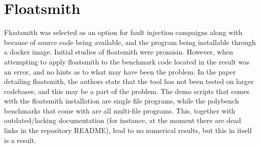 \section{Floatsmith}

Floatsmith was selected as an option for fault injection campaigns along with \taffo{} because of source code being available, and the program being installable through a docker image. Initial studies of floatsmith were promisin.
However, when attempting to apply floatsmith to the benchmark code located in \taffo{} the result was an error, and no hints as to what may have been the problem. In the paper detailing floatsmith, the authors state that the tool has not been tested on larger codebases, and this may be a part of the problem. The demo scripts that comes with the floatsmith installation are single file programs, while the polybench benchmarks that come with \taffo{} are all multi-file programs. This, together with outdated/lacking documentation (for instance, at the moment there are dead links in the repository README), lead to no numerical results, but this in itself is a result.


